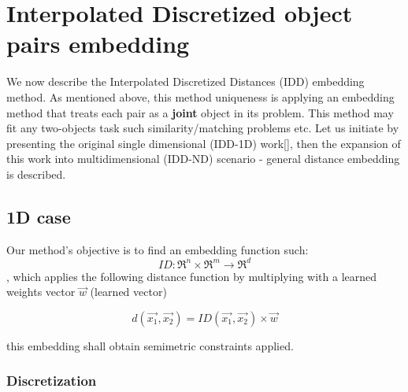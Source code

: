 
\chapter{Interpolated Discretized object pairs embedding} %

\label{Chapter3} %

We now describe the Interpolated Discretized Distances (IDD) embedding method.
As mentioned above, this method uniqueness is applying an embedding method that treats each pair as a \textbf{joint} object in its problem.
This method may fit any two-objects task such similarity/matching problems etc. 
Let us initiate by presenting the original single dimensional (IDD-1D) work[], then the expansion of this work into multidimensional (IDD-ND) scenario - general distance embedding is described.

\section{1D case}

	Our method's objective is to find an embedding function such:
	\cite{einstein}
	\begin{equation}
		ID:\Re^n \times \Re^m \rightarrow \Re^d
	\end{equation}
	, which applies the following distance function by multiplying with a learned weights vector $\overrightarrow{w}$ (learned vector)
	
	\begin{equation}
	d(\overrightarrow{x_1} , \overrightarrow{x_2}) = ID(\overrightarrow{x_1} , \overrightarrow{x_2}) \times \overrightarrow{w}
	\end{equation}
	
	this embedding shall obtain semimetric constraints applied.
	
	\subsection{Discretization}

